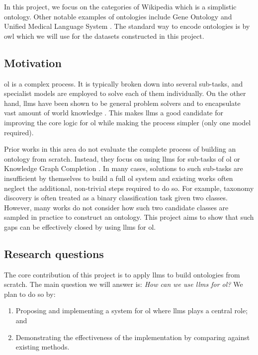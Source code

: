 In this project, we focus on the categories of Wikipedia which is a simplistic ontology. Other notable examples of ontologies include Gene Ontology \citep{gene-ontology} and Unified Medical Language System \citep{umls}. The standard way to encode ontologies is by \gls{owl} which we will use for the datasets constructed in this project.

\subsection*{Motivation}

\gls{ol} is a complex process. It is typically broken down into several sub-tasks, and specialist models are employed to solve each of them individually. On the other hand, \gls{llm}s have been shown to be general problem solvers \citep{gpt3} and to encapsulate vast amount of world knowledge \citep{llm-knowledge-base}. This makes \gls{llm}s a good candidate for improving the core logic for \gls{ol} while making the process simpler (only one model required).

Prior works in this area do not evaluate the complete process of building an ontology from scratch. Instead, they focus on using \gls{llm}s for sub-tasks of \gls{ol} \citep{llms4ol} or Knowledge Graph Completion \citep{yao2023exploring,cabot2021rebel}. In many cases, solutions to such sub-tasks are insufficient by themselves to build a full \gls{ol} system and existing works often neglect the additional, non-trivial steps required to do so. For example, taxonomy discovery is often treated as a binary classification task given two classes. However, many works do not consider how such two candidate classes are sampled in practice to construct an ontology. This project aims to show that such gaps can be effectively closed by using \gls{llm}s for \gls{ol}.

\subsection*{Research questions}

The core contribution of this project is to apply \gls{llm}s to build ontologies from scratch. The main question we will answer is: \emph{How can we use \gls{llm}s for \gls{ol}?} We plan to do so by:
\begin{enumerate}
    \item Proposing and implementing a system for \gls{ol} where \gls{llm}s plays a central role; and
    \item Demonstrating the effectiveness of the implementation by comparing against existing methods.
\end{enumerate}

